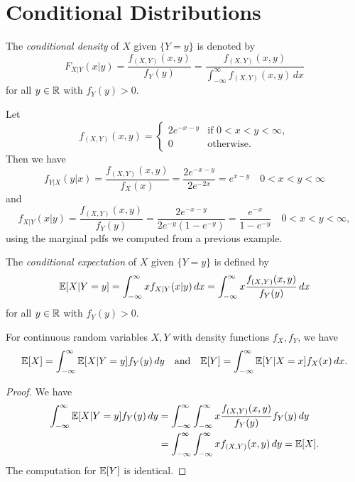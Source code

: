 \section{Conditional Distributions}

\begin{definition}
  The \emph{conditional density} of $X$ given
  $\{Y = y\}$ is denoted by
  \[
    F_{X | Y}(x | y) = \frac{f_{(X, Y)}(x, y)}{f_Y(y)}
    = \frac{f_{(X, Y)}(x, y)}{\displaystyle \int_{-\infty}^\infty f_{(X, Y)}(x, y) \, dx}
  \]
   for all $y \in \mathbb{R}$ with $f_Y(y) > 0$.
\end{definition}

\begin{example}
  Let
  \[
    f_{(X, Y)}(x, y) =
    \begin{cases}
      2e^{-x - y} & \text{if $0 < x < y < \infty$}, \\
      0 & \text{otherwise}.
    \end{cases}
  \]
  Then we have
  \[
    f_{Y | X}(y | x)
    = \frac{f_{(X, Y)}(x, y)}{f_X(x)}
    = \frac{2e^{-x - y}}{2e^{-2x}} = e^{x - y}
    \quad \text{$0 < x < y < \infty$}
  \]
  and
  \[
    f_{X | Y}(x | y) = \frac{f_{(X, Y)}(x, y)}{f_Y(y)}
    = \frac{2e^{-x - y}}{2e^{-y}(1 - e^{-y})}
    = \frac{e^{-x}}{1 - e^{-y}} \quad \text{$0 < x < y < \infty$},
  \]
  using the marginal pdfs we computed from a previous
  example.
\end{example}

\begin{definition}
  The \emph{conditional expectation} of $X$ given
  $\{Y = y\}$ is defined by
  \[
    \mathbb{E}[X | Y = y]
    = \int_{-\infty}^\infty x f_{X | Y}(x | y) \, dx
    = \int_{-\infty}^\infty x \frac{f_{(X, Y)}(x, y)}{f_Y(y)} \, dx
  \]
  for all $y \in \mathbb{R}$ with $f_Y(y) > 0$.
\end{definition}

\begin{prop}
  For continuous random variables $X, Y$ with
  density functions $f_X, f_Y$, we have
  \[
    \mathbb{E}[X] =
    \int_{-\infty}^\infty \mathbb{E}[X | Y = y] f_Y(y) \, dy
    \quad \text{and} \quad
    \mathbb{E}[Y] =
    \int_{-\infty}^\infty \mathbb{E}[Y | X = x] f_X(x) \, dx.
  \]
\end{prop}

\begin{proof}
  We have
  \begin{align*}
    \int_{-\infty}^\infty \mathbb{E}[X | Y = y] f_Y(y) \, dy
    &= \int_{-\infty}^\infty \int_{-\infty}^\infty x \frac{f_{(X, Y)}(x, y)}{f_Y(y)} f_Y(y) \, dy \\
    &= \int_{-\infty}^\infty \int_{-\infty}^\infty x f_{(X, Y)}(x, y) \, dy = \mathbb{E}[X].
  \end{align*}
  The computation for $\mathbb{E}[Y]$ is identical.
\end{proof}

